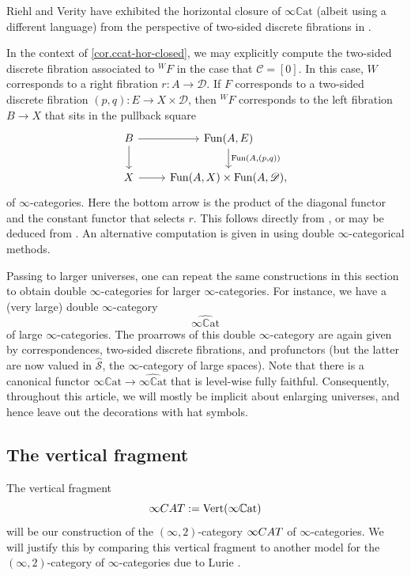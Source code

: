 \documentclass[a4paper, 11pt]{amsart}
\numberwithin{theorem}{section}
\theoremstyle{definition}
\newcommand{\cat}[1]{\textup{#1}}
\newcommand{\fun}{\mathrm{Fun}}
\newcommand{\CAT}{\cat{CAT}}
\renewcommand{\S}{\mathscr{S}}
\newcommand{\C}{\mathscr{C}}
\renewcommand{\D}{\mathscr{D}}
\renewcommand{\Vert}{\mathrm{Vert}}
\newcommand{\CCAT}{\mathbb{C}\mathrm{at}}
\begin{document}
\begin{remark}\label{rem.ccat-hor-closed-bifib}
	Riehl and Verity have exhibited the horizontal closure of $\infty\CCAT$ (albeit using a different language) from the perspective of 
	two-sided discrete fibrations in \cite[Theorem 12.3.6]{RiehlVerity}. 

	In the context of \cref{cor.ccat-hor-closed},  we may explicitly compute the two-sided discrete fibration 
	associated to 
	${}^WF$ 
	in the case that $\C = [0]$. In this case, $W$ corresponds to a right fibration $r : A \rightarrow \D$. If $F$ corresponds to a two-sided discrete 
	fibration $(p,q) : E \rightarrow X \times \D$, then ${}^WF$ corresponds to the left fibration $B \rightarrow X$ that sits in the pullback square 
	\[
		\begin{tikzcd}
			B \arrow[r]\arrow[d] & \fun(A, E) \arrow[d, "{\fun(A, (p,q))}"] \\
			X \arrow[r] & \fun(A, X) \times \fun(A, \D),
		\end{tikzcd}
	\]
	of $\infty$-categories. Here the bottom arrow is the product of the diagonal functor and the constant functor that selects $r$. This follows directly 
	from \cite[Proposition 4.24]{Stevenson}, or may be deduced from \cite[Lemma 12.3.7]{RiehlVerity}. An alternative computation is given in \cite{EquipII} using 
	double $\infty$-categorical methods.
\end{remark}


\begin{remark}\label{rem.ccat-size}
	Passing to larger universes, one can repeat the same constructions in this section to obtain double $\infty$-categories for larger $\infty$-cate\-gories.
	For instance, we have a (very large) double $\infty$-category 
	$$
	\widehat{\infty\CCAT} 
	$$ 
	of large $\infty$-categories. The proarrows of this double $\infty$-category 
	are again given by correspondences, two-sided discrete fibrations, and profunctors (but the latter are now valued in $\hat{\S}$, the $\infty$-category of large spaces).
	Note that there is a canonical functor $\infty\CCAT \rightarrow \widehat{\infty\CCAT}$ that is level-wise fully faithful. 
	Consequently, throughout this article, we will mostly be implicit about enlarging universes, 
	and hence leave out the decorations with hat symbols.
\end{remark}

\subsection{The vertical fragment}\label{ssection.comparison-models-infty2-infty-cats}
The vertical fragment $$\infty\CAT := \Vert(\infty\CCAT)$$ will be our construction of the $(\infty,2)$-cate\-go\-ry $\infty\CAT$ of 
$\infty$-categories. We will justify this by comparing this vertical fragment 
to another model for the $(\infty,2)$-category of $\infty$-categories due to Lurie \cite{LurieInfty2}.
\end{document}
